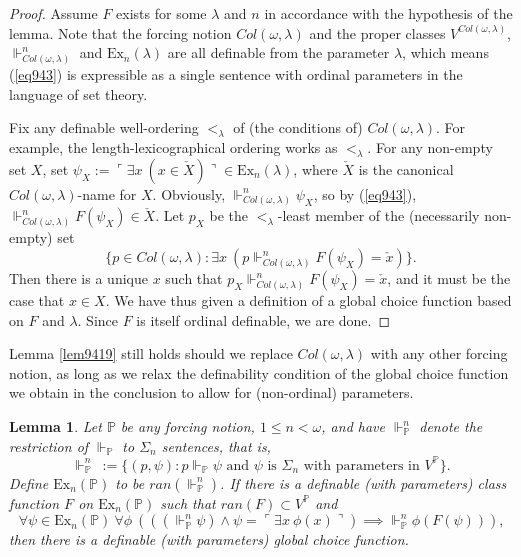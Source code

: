 \documentclass[12pt, twoside]{memoir}
\numberwithin{equation}{section}
\newtheorem{lem}[thm]{Lemma}
\theoremstyle{definition}
\theoremstyle{remark}
\theoremstyle{definition}
\theoremstyle{definition}
\theoremstyle{definition}
\theoremstyle{remark}
\begin{document}
\begin{proof}
Assume $F$ exists for some $\lambda$ and $n$ in accordance with the hypothesis of the lemma. Note that the forcing notion $Col(\omega, \lambda)$ and the proper classes $V^{Col(\omega, \lambda)}$, $\Vdash^n_{Col(\omega, \lambda)}$ and $\mathrm{Ex}_n(\lambda)$ are all definable from the parameter $\lambda$, which means (\ref{eq943}) is expressible as a single sentence with ordinal parameters in the language of set theory. 

Fix any definable well-ordering $<_{\lambda}$ of (the conditions of) $Col(\omega, \lambda)$. For example, the length-lexicographical ordering works as $<_{\lambda}$. For any non-empty set $X$, set $\psi_X := \ulcorner \exists x \ ( x \in \check{X}) \urcorner \in \mathrm{Ex}_n(\lambda)$, where $\check{X}$ is the canonical $Col(\omega, \lambda)$-name for $X$. Obviously, $\Vdash^n_{Col(\omega, \lambda)} \psi_X$, so by (\ref{eq943}), $\Vdash^n_{Col(\omega, \lambda)} F(\psi_X) \in \check{X}$. Let $p_X$ be the $<_{\lambda}$-least member of the (necessarily non-empty) set 
\begin{equation*}
    \{p \in Col(\omega, \lambda) : \exists x \ (p \Vdash^n_{Col(\omega, \lambda)} F(\psi_X) = \check{x})\} \text{.}
\end{equation*}
Then there is a unique $x$ such that $p_X \Vdash^n_{Col(\omega, \lambda)} F(\psi_X) = \check{x}$, and it must be the case that $x \in X$. We have thus given a definition of a global choice function based on $F$ and $\lambda$. Since $F$ is itself ordinal definable, we are done.
\end{proof}

Lemma \ref{lem9419} still holds should we replace $Col(\omega, \lambda)$ with any other forcing notion, as long as we relax the definability condition of the global choice function we obtain in the conclusion to allow for (non-ordinal) parameters. 

\begin{lem}\label{lem9420}
Let $\mathbb{P}$ be any forcing notion, $1 \leq n < \omega$, and have $\Vdash^n_{\mathbb{P}}$ denote the restriction of $\Vdash_{\mathbb{P}}$ to $\Sigma_n$ sentences, that is,
\begin{equation*}
    \Vdash^n_{\mathbb{P}} \ := \{(p, \psi) : p \Vdash_{\mathbb{P}} \psi \text{ and } \psi \text{ is } \Sigma_n \text{ with parameters in } V^{\mathbb{P}}\} \text{.}
\end{equation*}
Define $\mathrm{Ex}_n(\mathbb{P})$ to be $ran(\Vdash^n_{\mathbb{P}})$. If there is a definable (with parameters) class function $F$ on $\mathrm{Ex}_n(\mathbb{P})$ such that $ran(F) \subset V^{\mathbb{P}}$ and 
\begin{equation*}
    \forall \psi \in \mathrm{Ex}_n(\mathbb{P}) \ \forall \phi \ (((\Vdash^n_{\mathbb{P}} \psi) \wedge \psi = \ulcorner \exists x \ \phi(x) \urcorner) \implies \Vdash^n_{\mathbb{P}} \phi(F(\psi))) \text{,}
\end{equation*}
then there is a definable (with parameters) global choice function.
\end{lem}
\end{document}
